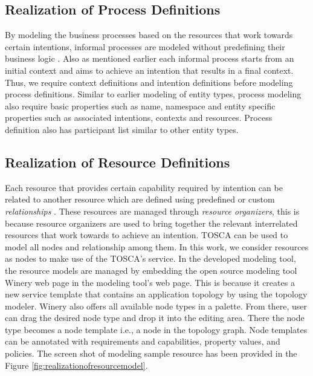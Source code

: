 \subsection{Realization of Process Definitions}
By modeling the business processes based on the resources that work towards certain intentions, informal processes are modeled without predefining their business logic \cite{Sungur2014a}. Also as mentioned earlier each informal process starts from an initial context and aims to achieve an intention that results in a final context. Thus, we require context definitions and intention definitions before modeling process definitions. Similar to earlier modeling of entity types, process modeling also require basic properties such as name, namespace  and entity specific properties such as associated intentions, contexts and resources. Process definition also has participant list similar to other entity types. 

\subsection{Realization of Resource Definitions}
Each resource that provides certain capability required by intention can be related to another resource which are defined using predefined or custom \textit{relationships} \cite{Sungur2014a}. These resources are managed through \textit{resource organizers}, this is because resource organizers are used to bring together the relevant interrelated resources that work towards to achieve an intention. TOSCA \cite{Binz2014} can be used to model all nodes and relationship among them. In this work, we consider resources as nodes to make use of the TOSCA's service. In the developed modeling tool, the resource models are managed by embedding the open source modeling tool Winery web page \cite{Kopp2013} in the modeling tool's web page. This is because it creates a new service template that contains an application topology by using the topology modeler. Winery also offers all available node types in a palette. From there, user can drag the desired node type and drop it into the editing area. There the node type becomes a node template i.e., a node in the topology graph. Node templates can be annotated with requirements and capabilities, property values, and policies. The screen shot of modeling sample resource has been provided in the Figure \ref{fig:realizationofresourcemodel}. 


